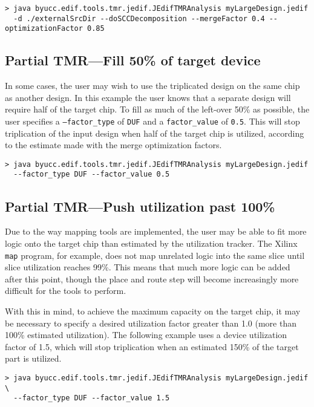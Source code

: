 \begin{verbatim}
> java byucc.edif.tools.tmr.jedif.JEdifTMRAnalysis myLargeDesign.jedif 
  -d ./externalSrcDir --doSCCDecomposition --mergeFactor 0.4 --optimizationFactor 0.85
\end{verbatim}


\subsection{Partial TMR---Fill 50\% of target device}
In some cases, the user may wish to use the triplicated design on the same chip 
as another design. In this example the user knows that a separate design will 
require half of the target chip. To fill as much of the left-over 50\% as 
possible, the user specifies a \texttt{--factor\_type} of \texttt{DUF} and a 
\texttt{factor\_value} of \texttt{0.5}. This will stop triplication of the 
input design when half of the target chip is utilized, according to the 
estimate made with the merge optimization factors.

\begin{verbatim}
> java byucc.edif.tools.tmr.jedif.JEdifTMRAnalysis myLargeDesign.jedif 
  --factor_type DUF --factor_value 0.5
\end{verbatim}


\subsection{Partial TMR---Push utilization past 100\%}
Due to the way mapping tools are implemented, the user may be able to fit more 
logic onto the target chip than estimated by the utilization tracker. The 
Xilinx \texttt{map} program, for example, does not map unrelated logic into the 
same slice until slice utilization reaches 99\%. This means that much more 
logic can be added after this point, though the place and route step will 
become increasingly more difficult for the tools to perform.

With this in mind, to achieve the maximum capacity on the target chip, it may 
be necessary to specify a desired utilization factor greater than 1.0 (more 
than 100\% estimated utilization). The following example uses a device 
utilization factor of 1.5, which will stop triplication when an estimated 150\% 
of the target part is utilized.

\begin{verbatim}
> java byucc.edif.tools.tmr.jedif.JEdifTMRAnalysis myLargeDesign.jedif \
  --factor_type DUF --factor_value 1.5
\end{verbatim}


